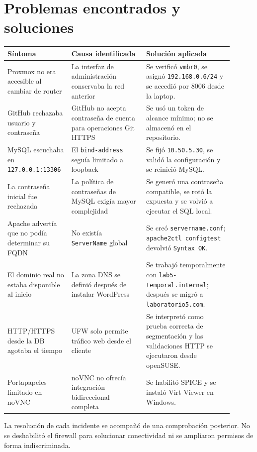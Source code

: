 \section{Problemas encontrados y soluciones}

\begin{longtable}{p{0.23\linewidth}p{0.31\linewidth}p{0.36\linewidth}}
\toprule
\textbf{Síntoma} & \textbf{Causa identificada} & \textbf{Solución aplicada} \\
\midrule
Proxmox no era accesible al cambiar de router & La interfaz de administración conservaba la red anterior & Se verificó \texttt{vmbr0}, se asignó \texttt{192.168.0.6/24} y se accedió por 8006 desde la laptop. \\
GitHub rechazaba usuario y contraseña & GitHub no acepta contraseña de cuenta para operaciones Git HTTPS & Se usó un token de alcance mínimo; no se almacenó en el repositorio. \\
MySQL escuchaba en \texttt{127.0.0.1:13306} & El \texttt{bind-address} seguía limitado a loopback & Se fijó \texttt{10.50.5.30}, se validó la configuración y se reinició MySQL. \\
La contraseña inicial fue rechazada & La política de contraseñas de MySQL exigía mayor complejidad & Se generó una contraseña compatible, se rotó la expuesta y se volvió a ejecutar el SQL local. \\
Apache advertía que no podía determinar su FQDN & No existía \texttt{ServerName} global & Se creó \texttt{servername.conf}; \texttt{apache2ctl configtest} devolvió \texttt{Syntax OK}. \\
El dominio real no estaba disponible al inicio & La zona DNS se definió después de instalar WordPress & Se trabajó temporalmente con \texttt{lab5-temporal.internal}; después se migró a \texttt{laboratorio5.com}. \\
HTTP/HTTPS desde la DB agotaba el tiempo & UFW solo permite tráfico web desde el cliente & Se interpretó como prueba correcta de segmentación y las validaciones HTTP se ejecutaron desde openSUSE. \\
Portapapeles limitado en noVNC & noVNC no ofrecía integración bidireccional completa & Se habilitó SPICE y se instaló Virt Viewer en Windows. \\
\bottomrule
\end{longtable}

La resolución de cada incidente se acompañó de una comprobación posterior. No se deshabilitó el firewall para solucionar conectividad ni se ampliaron permisos de forma indiscriminada.

